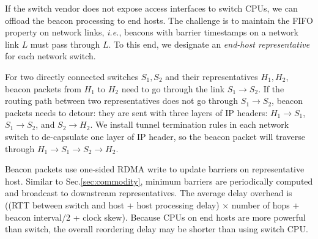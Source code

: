 If the switch vendor does not expose access interfaces to switch CPUs, we can offload the beacon processing to end hosts. The challenge is to maintain the FIFO property on network links, \emph{i.e.}, beacons with barrier timestamps on a network link $L$ must pass through $L$. To this end, we designate an \emph{end-host representative} for each network switch. %

For two directly connected switches $S_1, S_2$ and their representatives $H_1, H_2$, beacon packets from $H_1$ to $H_2$ need to go through the link $S_1 \rightarrow S_2$. If the routing path between two representatives does not go through $S_1 \rightarrow S_2$, beacon packets needs to detour: they are sent with three layers of IP headers: $H_1 \rightarrow S_1$, $S_1 \rightarrow S_2$, and $S_2 \rightarrow H_2$.
We install tunnel termination rules in each network switch to de-capsulate one layer of IP header, so the beacon packet will traverse through $H_1 \rightarrow S_1 \rightarrow S_2 \rightarrow H_2$.

Beacon packets use one-sided RDMA write to update barriers on representative host.
Similar to Sec.\ref{sec:commodity}, minimum barriers are periodically computed and broadcast to downstream representatives.
The average delay overhead is ((RTT between switch and host + host processing delay) $\times$ number of hops + beacon interval/2 + clock skew). Because CPUs on end hosts are more powerful than switch, the overall reordering delay may be shorter than using switch CPU.
